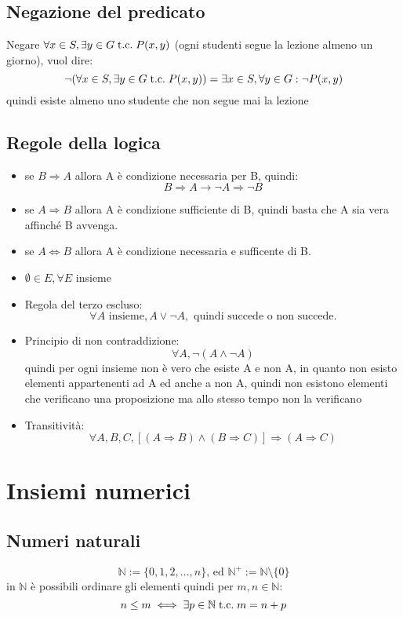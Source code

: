 \documentclass[a4paper,12pt]{article}
\begin{document}
	\subsection{Negazione del predicato}
	Negare $\forall x \in S, \exists y \in G \;\text{t.c.}\; P(x, y)$ (ogni studenti segue la lezione almeno un giorno), vuol dire:
	\[\neg(\forall x \in S, \exists y \in G \;\text{t.c.}\; P(x, y)) = \exists x \in S, \forall y \in G : \neg P(x, y)\]
	quindi esiste almeno uno studente che non segue mai la lezione
	
	\subsection{Regole della logica}
	\begin{itemize}
		\item se $B \Rightarrow A$ allora A è condizione necessaria per B, quindi:
		\[B \Rightarrow A \rightarrow \neg A \Rightarrow \neg B\]
		\item se $A \Rightarrow B$ allora A è condizione sufficiente di B, quindi basta che A sia vera affinché B avvenga.
		\item se $A \iff B$ allora A è condizione necessaria e sufficente di B.
		\item $\emptyset \in E, \forall E$ insieme
		\item Regola del terzo escluso:
		\[\forall A \text{ insieme}, A \vee \neg A, \text{ quindi succede o non succede}.\]
		\item Principio di non contraddizione:
		\[\forall A, \neg(A \wedge \neg A)\]
		quindi per ogni insieme non è vero che esiste A e non A, in quanto non esisto elementi appartenenti ad A ed anche a non A, quindi non esistono elementi che verificano una proposizione ma allo stesso tempo non la verificano
		\item Transitività:
		\[\forall A, B, C, [(A \Rightarrow B) \wedge (B \Rightarrow C)] \Rightarrow (A \Rightarrow C)\]
	\end{itemize}
	
	\section{Insiemi numerici}
	\subsection{Numeri naturali}
	\[\mathbb{N} := \{0, 1, 2, ..., n\} \text{, ed } \mathbb{N}^+ := \mathbb{N} \setminus \{0\} \]
	in $\mathbb{N}$ è possibili ordinare gli elementi quindi per $m,n \in \mathbb{N}$:
	\[n \leq m \iff \exists p \in \mathbb{N} \;\text{t.c.}\; m = n + p\]
	
\end{document}
